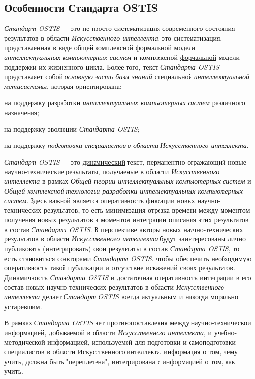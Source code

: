 \subsection{Особенности Стандарта OSTIS}
\label{standard_peculiarities}

\textit{Стандарт OSTIS} --- это не просто систематизация современного состояния результатов в области \textit{Искусственного интеллекта}, это систематизация, представленная в виде общей комплексной \uline{формальной} модели \textit{интеллектуальных компьютерных систем} и комплексной \uline{формальной} модели поддержки их жизненного цикла. Более того, текст \textit{Стандарта OSTIS} представляет собой \textit{основную часть базы знаний} специальной \textit{интеллектуальной метасистемы}, которая ориентирована:

\begin{textitemize}
	\item на поддержку разработки \textit{интеллектуальных компьютерных систем} различного назначения;
	\item на поддержку эволюции \textit{Стандарта OSTIS};
	\item на поддержку \textit{подготовки специалистов в области Искусственного интеллекта}.
\end{textitemize}

\textit{Стандарт OSTIS} --- это \uline{динамический} текст, перманентно отражающий новые научно-технические результаты, получаемые в области \textit{Искусственного интеллекта} в рамках \textit{Общей теории интеллектуальных компьютерных систем} и \textit{Общей комплексной технологии разработки интеллектуальных компьютерных систем}. Здесь важной является оперативность фиксации новых научно-технических результатов, то есть минимизация отрезка времени между моментом получения новых результатов и моментом интеграции описания этих результатов в состав \textit{Стандарта OSTIS}. В перспективе авторы новых научно-технических результатов в области \textit{Искусственного интеллекта} будут заинтересованы лично публиковать (интегрировать) свои результаты в состав \textit{Стандарта OSTIS}, то есть становиться соавторами \textit{Стандарта OSTIS}, чтобы обеспечить необходимую оперативность такой публикации и отсутствие искажений своих результатов. Динамичность \textit{Стандарта OSTIS} и достаточная оперативность интеграции в его состав новых научно-технических результатов в области \textit{Искусственного интеллекта} делает \textit{Стандарт OSTIS} всегда актуальным и никогда морально устаревшим.

В рамках \textit{Стандарта OSTIS} нет противопоставления между научно-технической информацией, добываемой в области \textit{Искусственного интеллекта}, и учебно-методической информацией, используемой для подготовки и самоподготовки специалистов в области Искусственного интеллекта. информация о том, чему учить, должна быть "переплетена"{}, интегрирована с информацией о том, как учить.

